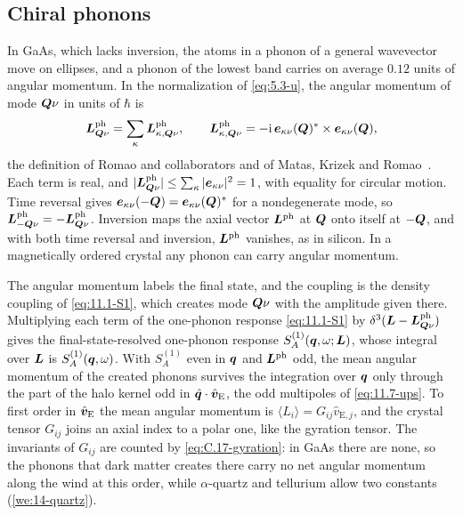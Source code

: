 \subsection{Chiral phonons}\label{sec:14.5-phonons}

In GaAs, which lacks inversion, the atoms in a phonon of a general wavevector move on ellipses, and a phonon of the lowest band carries on average $0.12$ units of angular momentum. In the normalization of \cref{eq:5.3-u}, the angular momentum of mode $\bm{Q}\nu$ in units of $\hbar$ is
\begin{equation}
  \bm{L}^{\mathrm{ph}}_{\bm{Q}\nu} = \sum_\kappa\bm{L}^{\mathrm{ph}}_{\kappa,\bm{Q}\nu}, \qquad
  \bm{L}^{\mathrm{ph}}_{\kappa,\bm{Q}\nu} = -\mathrm{i}\,\bm{e}_{\kappa\nu}(\bm{Q})^*\times\bm{e}_{\kappa\nu}(\bm{Q}) ,
  \label{eq:14.5-Lph}
\end{equation}
the definition of Romao and collaborators and of Matas, Krizek and Romao~\cites[Eq.~(6)]{romao2023chiral}[Eq.~(11)]{matas2025chiral}. Each term is real, and $|\bm{L}^{\mathrm{ph}}_{\bm{Q}\nu}| \le \sum_\kappa|\bm{e}_{\kappa\nu}|^2 = 1$, with equality for circular motion. Time reversal gives $\bm{e}_{\kappa\nu}(-\bm{Q}) = \bm{e}_{\kappa\nu}(\bm{Q})^*$ for a nondegenerate mode, so $\bm{L}^{\mathrm{ph}}_{-\bm{Q}\nu} = -\bm{L}^{\mathrm{ph}}_{\bm{Q}\nu}$. Inversion maps the axial vector $\bm{L}^{\mathrm{ph}}$ at $\bm{Q}$ onto itself at $-\bm{Q}$, and with both time reversal and inversion, $\bm{L}^{\mathrm{ph}}$ vanishes, as in silicon. In a magnetically ordered crystal any phonon can carry angular momentum.

The angular momentum labels the final state, and the coupling is the density coupling of \cref{eq:11.1-S1}, which creates mode $\bm{Q}\nu$ with the amplitude given there. Multiplying each term of the one-phonon response \cref{eq:11.1-S1} by $\delta^3(\bm{L} - \bm{L}^{\mathrm{ph}}_{\bm{Q}\nu})$ gives the final-state-resolved one-phonon response $S^{(1)}_A(\bm{q},\omega;\bm{L})$, whose integral over $\bm{L}$ is $S^{(1)}_A(\bm{q},\omega)$. With $S^{(1)}_A$ even in $\bm{q}$ and $\bm{L}^{\mathrm{ph}}$ odd, the mean angular momentum of the created phonons survives the integration over $\bm{q}$ only through the part of the halo kernel odd in $\hat{\bm{q}}\cdot\hat{\bm{v}}_{\mathrm{E}}$, the odd multipoles of \cref{eq:11.7-ups}. To first order in $\hat{\bm{v}}_{\mathrm{E}}$ the mean angular momentum is $\langle L_i\rangle = G_{ij}\hat v_{\mathrm{E},j}$, and the crystal tensor $G_{ij}$ joins an axial index to a polar one, like the gyration tensor. The invariants of $G_{ij}$ are counted by \cref{eq:C.17-gyration}: in GaAs there are none, so the phonons that dark matter creates there carry no net angular momentum along the wind at this order, while $\alpha$-quartz and tellurium allow two constants (\cref{we:14-quartz}).

